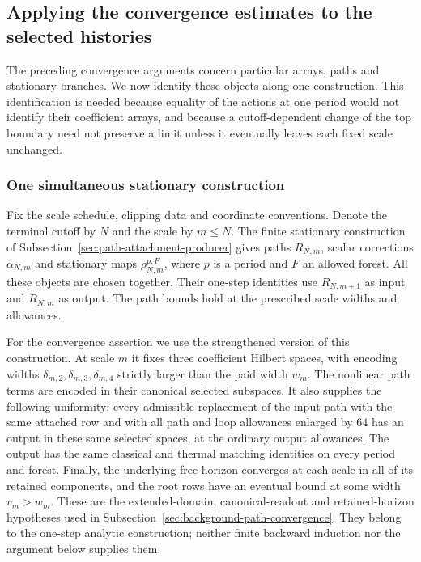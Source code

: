 \subsection{Applying the convergence estimates to the selected histories}
\label{sec:selected-history-limits}
The preceding convergence arguments concern particular arrays, paths and
stationary branches. We now identify these objects along one construction.
This identification is needed because equality of the actions at one
period would not identify their coefficient arrays, and because a
cutoff-dependent change of the top boundary need not preserve a limit
unless it eventually leaves each fixed scale unchanged.

\subsubsection{One simultaneous stationary construction}
Fix the scale schedule, clipping data and coordinate conventions. Denote
the terminal cutoff by $N$ and the scale by $m\le N$. The finite
stationary construction of Subsection~\ref{sec:path-attachment-producer}
gives paths $R_{N,m}$, scalar corrections $\alpha_{N,m}$ and stationary
maps $\rho_{N,m}^{p,F}$, where $p$ is a period and $F$ an allowed forest.
All these objects are chosen together. Their one-step identities use
$R_{N,m+1}$ as input and $R_{N,m}$ as output. The path bounds hold at
the prescribed scale widths and allowances.

For the convergence assertion we use the strengthened version of this
construction. At scale $m$ it fixes three coefficient Hilbert spaces,
with encoding widths $\delta_{m,2},\delta_{m,3},\delta_{m,4}$ strictly
larger than the paid width $w_m$. The nonlinear path terms are encoded
in their canonical selected subspaces. It also supplies the following
uniformity: every admissible replacement of the input path with the
same attached row and with all path and loop allowances enlarged by
$64$ has an output in these same selected spaces, at the ordinary
output allowances. The output has the same classical and thermal
matching identities on every period and forest. Finally, the underlying
free horizon converges at each scale in all of its retained components,
and the root rows have an eventual bound at some width $v_m>w_m$.
These are the extended-domain, canonical-readout and retained-horizon
hypotheses used in Subsection~\ref{sec:background-path-convergence}.
They belong to the one-step analytic construction; neither finite
backward induction nor the argument below supplies them.


